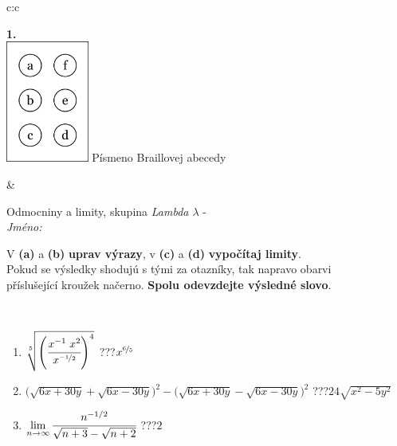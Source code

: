 \documentclass[10pt]{report}
\begin{document}
\begin{tabular}{c:c}
\begin{minipage}[c][104.5mm][t]{0.5\linewidth}
\begin{center}
\begin{minipage}{0.20\linewidth}
\begin{center}
{\Huge\bfseries 1.} \\[2mm]
\includegraphics[height=40mm]{../images/braille.png}
{\small Písmeno Braillovej abecedy}
\end{center}
\end{minipage}
\end{center}
\end{minipage}
&
\begin{minipage}[c][104.5mm][t]{0.5\linewidth}
\begin{center}
\vspace{7mm}
{\huge Odmocniny a limity, skupina \textit{Lambda $\lambda$} -}\\[5mm]
\textit{Jméno:}\phantom{xxxxxxxxxxxxxxxxxxxxxxxxxxxxxxxxxxxxxxxxxxxxxxxxxxxxxxxxxxxxxxxxx}\\[5mm]
\begin{minipage}{0.95\linewidth}
\begin{center}
V \textbf{(a)} a \textbf{(b)} \textbf{uprav výrazy}, v \textbf{(c)} a \textbf{(d)} \textbf{vypočítaj limity}.\\Pokud se výsledky shodujú s tými za otazníky, tak napravo obarvi\\příslušející kroužek načerno. \textbf{Spolu odevzdejte výsledné slovo}.
\end{center}
\end{minipage}
\\[1mm]
\begin{minipage}{0.79\linewidth}
\begin{center}
\begin{varwidth}{\linewidth}
\begin{enumerate}
\small
\item $\sqrt[5]{\left(\cfrac{x^{-1}\;x^{2}}{x^{\nicefrac{-1}{2}}}\right)^{4}}$\quad \dotfill\; ???\;\dotfill \quad $x^{\nicefrac{6}{5}}$
\item {\footnotesize{\scriptsize$\big(\sqrt{6x+30y}+\sqrt{6x-30y}\big)^2-\big(\sqrt{6x+30y}-\sqrt{6x-30y}\big)^2$}\quad \dotfill\; ???\;\dotfill \quad $24\sqrt{x^2-5y^2}$}
\item $\lim\limits_{n\to\infty}\cfrac{n^{-1/2}}{\sqrt{n+3}-\sqrt{n+2}}$\quad \dotfill\; ???\;\dotfill \quad $2$

\end{enumerate}
\end{varwidth}
\end{center}
\end{minipage}
\end{center}
\end{minipage}
\end{tabular}
\end{document}
